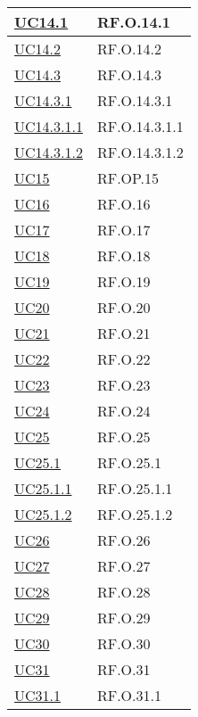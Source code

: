 \begin{adjustwidth}{-0.5cm}{-0.5cm}
\begin{longtable}{|P{4,5cm}|>{\arraybackslash}P{9cm}|}
    \hline
    \hyperref[UC14point1]{UC14.1} & RF.O.14.1 \\
    \hline
    \hyperref[UC14point2]{UC14.2} & RF.O.14.2 \\
    \hline
    \hyperref[UC14point3]{UC14.3} & RF.O.14.3 \\
    \hline
    \hyperref[UC14point3point1]{UC14.3.1} & RF.O.14.3.1 \\
    \hline
    \hyperref[UC14point3point1point1]{UC14.3.1.1} & RF.O.14.3.1.1 \\
    \hline
    \hyperref[UC14point3point1point2]{UC14.3.1.2} & RF.O.14.3.1.2 \\
    \hline
    \hyperref[UC15]{UC15} & RF.OP.15 \\
    \hline
    \hyperref[UC16]{UC16} & RF.O.16 \\
    \hline
    \hyperref[UC17]{UC17} & RF.O.17 \\
    \hline
    \hyperref[UC18]{UC18} & RF.O.18 \\
    \hline
    \hyperref[UC19]{UC19} & RF.O.19 \\
    \hline
    \hyperref[UC20]{UC20} & RF.O.20 \\
    \hline
    \hyperref[UC21]{UC21} & RF.O.21 \\
    \hline
    \hyperref[UC22]{UC22} & RF.O.22 \\
    \hline
    \hyperref[UC23]{UC23} & RF.O.23 \\
    \hline
    \hyperref[UC24]{UC24} & RF.O.24 \\
    \hline
    \hyperref[UC25]{UC25} & RF.O.25 \\
    \hline
    \hyperref[UC25point1]{UC25.1} & RF.O.25.1 \\
    \hline
    \hyperref[UC25point1point1]{UC25.1.1} & RF.O.25.1.1 \\
    \hline
    \hyperref[UC25poin1point2]{UC25.1.2} & RF.O.25.1.2 \\
    \hline
    \hyperref[UC26]{UC26} & RF.O.26 \\
    \hline
    \hyperref[UC27]{UC27} & RF.O.27 \\
    \hline
    \hyperref[UC28]{UC28} & RF.O.28 \\
    \hline
    \hyperref[UC29]{UC29} & RF.O.29 \\
    \hline
    \hyperref[UC30]{UC30} & RF.O.30 \\
    \hline
    \hyperref[UC31]{UC31} & RF.O.31 \\
    \hline
    \hyperref[UC31point1]{UC31.1} & RF.O.31.1 \\

\end{longtable}
\end{adjustwidth}
